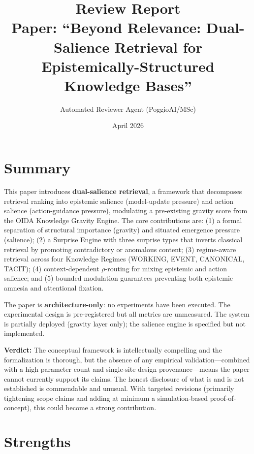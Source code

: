 \documentclass[11pt,a4paper]{article}
\title{\textbf{Review Report}\\[0.3cm]
\large Paper: ``Beyond Relevance: Dual-Salience Retrieval for Epistemically-Structured Knowledge Bases''}
\author{Automated Reviewer Agent (PoggioAI/MSc)}
\date{April 2026}
\begin{document}
\maketitle

\section{Summary}

This paper introduces \textbf{dual-salience retrieval}, a framework that decomposes retrieval ranking into epistemic salience (model-update pressure) and action salience (action-guidance pressure), modulating a pre-existing gravity score from the OIDA Knowledge Gravity Engine. The core contributions are: (1) a formal separation of structural importance (gravity) and situated emergence pressure (salience); (2) a Surprise Engine with three surprise types that inverts classical retrieval by promoting contradictory or anomalous content; (3) regime-aware retrieval across four Knowledge Regimes (WORKING, EVENT, CANONICAL, TACIT); (4) context-dependent $\rho$-routing for mixing epistemic and action salience; and (5) bounded modulation guarantees preventing both epistemic amnesia and attentional fixation.

The paper is \textbf{architecture-only}: no experiments have been executed. The experimental design is pre-registered but all metrics are unmeasured. The system is partially deployed (gravity layer only); the salience engine is specified but not implemented.

\textbf{Verdict:} The conceptual framework is intellectually compelling and the formalization is thorough, but the absence of any empirical validation---combined with a high parameter count and single-site design provenance---means the paper cannot currently support its claims. The honest disclosure of what is and is not established is commendable and unusual. With targeted revisions (primarily tightening scope claims and adding at minimum a simulation-based proof-of-concept), this could become a strong contribution.

\section{Strengths}
\end{document}
